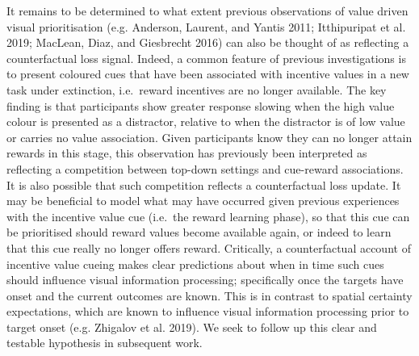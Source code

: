 \documentclass[11pt,halfline,a4paper,]{ouparticle}
\begin{document}
It remains to be determined to what extent previous observations of value driven visual prioritisation (e.g. Anderson, Laurent, and Yantis 2011; Itthipuripat et al. 2019; MacLean, Diaz, and Giesbrecht 2016) can also be thought of as reflecting a counterfactual loss signal. Indeed, a common feature of previous investigations is to present coloured cues that have been associated with incentive values in a new task under extinction, i.e.~reward incentives are no longer available. The key finding is that participants show greater response slowing when the high value colour is presented as a distractor, relative to when the distractor is of low value or carries no value association. Given participants know they can no longer attain rewards in this stage, this observation has previously been interpreted as reflecting a competition between top-down settings and cue-reward associations. It is also possible that such competition reflects a counterfactual loss update. It may be beneficial to model what may have occurred given previous experiences with the incentive value cue (i.e.~the reward learning phase), so that this cue can be prioritised should reward values become available again, or indeed to learn that this cue really no longer offers reward. Critically, a counterfactual account of incentive value cueing makes clear predictions about when in time such cues should influence visual information processing; specifically once the targets have onset and the current outcomes are known. This is in contrast to spatial certainty expectations, which are known to influence visual information processing prior to target onset (e.g. Zhigalov et al. 2019). We seek to follow up this clear and testable hypothesis in subsequent work.
\end{document}
